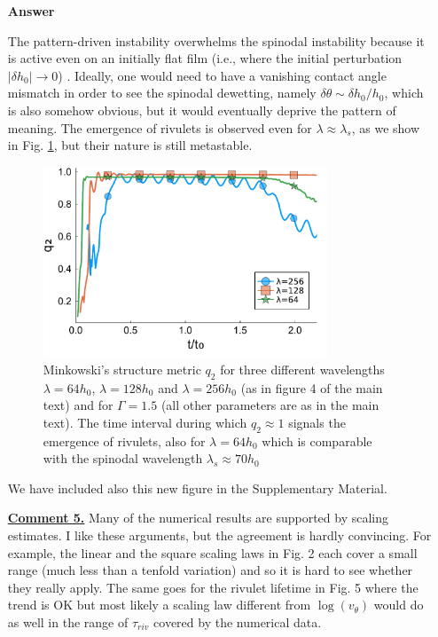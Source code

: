 \documentclass[12pt,english]{article}
\begin{document}
\begin{itemize}
\item[ \textbf{{Answer}}]
{
The pattern-driven instability overwhelms the spinodal instability because it is active even on an initially flat film 
(i.e., where the initial perturbation $|\delta h_0| \rightarrow 0$) 
\cite{KonnurPRL2000,KarguptaLangmuir2000,KarguptaPRL2001}. Ideally, one would need to have a vanishing 
contact angle mismatch in order to see the spinodal dewetting, namely $\delta \theta \sim \delta h_0/h_0$,
which is also somehow obvious, but it would eventually deprive the pattern of meaning. 
The emergence of rivulets is observed even for $\lambda \approx \lambda_s$, as we show 
in Fig. \ref{fig:q2_difflambda}, but their nature is still metastable. 
\begin{figure}
    \centering
    \includegraphics[width=0.8\textwidth]{SupMatFig_1.pdf}
    \caption{Minkowski's structure metric $q_2$ for three different wavelengths $\lambda=64 h_0$, $\lambda=128 h_0$ and $\lambda=256 h_0$ (as in figure 4 of the main text) and for $\Gamma=1.5$ (all other parameters are as in the main text). The time interval during which $q_2 \approx 1$ signals the emergence of rivulets, also for 
    $\lambda = 64 h_0$ which is comparable with the spinodal wavelength $\lambda_s \approx 70 h_0$}
    \label{fig:q2_difflambda}
\end{figure}
We have included also this new figure in the Supplementary Material.
}

\item[ \textbf{\underline{Comment 5.}}]
{ 
Many of the numerical results are supported by scaling estimates. I
like these arguments, but the agreement is hardly convincing. For
example, the linear and the square scaling laws in Fig. 2 each cover a
small range (much less than a tenfold variation) and so it is hard to
see whether they really apply. 
The same goes for the rivulet lifetime in Fig. 5 where the trend is OK but most likely a scaling law different from $\log(v_{\theta})$ would do as well in the range of $\tau_{riv}$ covered by the numerical data.
}


\end{itemize}
\end{document}
